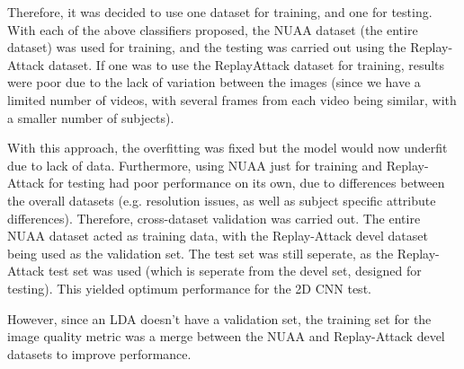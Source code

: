 \documentclass[10pt,a4paper]{article}
\begin{document}
            Therefore, it was decided to use one dataset for training, and one for testing.
            With each of the above classifiers proposed, the NUAA dataset (the entire dataset) was used for training, and the testing was carried out using the Replay-Attack dataset.
            If one was to use the ReplayAttack dataset for training, results were poor due to the lack of variation between the images (since we have a limited number of videos, with several frames from each video being similar, with a smaller number of subjects).
            
            With this approach, the overfitting was fixed but the model would now underfit due to lack of data. Furthermore, using NUAA just for training and Replay-Attack for testing had poor performance on its own, due to differences between the overall datasets (e.g. resolution issues, as well as subject specific attribute differences).
            Therefore, cross-dataset validation was carried out. The entire NUAA dataset acted as training data, with the Replay-Attack devel dataset being used as the validation set. The test set was still seperate, as the Replay-Attack test set was used (which is seperate from the devel set, designed for testing).
            This yielded optimum performance for the 2D CNN test.

            However, since an LDA doesn't have a validation set, the training set for the image quality metric was a merge between the NUAA and Replay-Attack devel datasets to improve performance.

       
\end{document}
